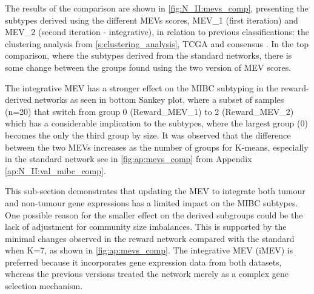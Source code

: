 The results of the comparison are shown in \cref{fig:N_II:mevs_comp}, presenting the subtypes derived using the different MEVs scores, MEV\_1 (first iteration) and MEV\_2 (second iteration - integrative), in relation to previous classifications: the clustering analysis from \cref{s:clustering_analysis}, TCGA and consensus \citep{Robertson2017-mg,Kamoun2020-tj}. In the top comparison, where the subtypes derived from the standard networks, there is some change between the groups found using the two version of MEV scores.

The integrative MEV has a stronger effect on the MIBC subtyping in the reward-derived networks as seen in bottom Sankey plot, where a subset of samples (n=20) that switch from group 0 (Reward\_MEV\_1) to 2 (Reward\_MEV\_2) which has a considerable implication to the subtypes, where the largest group (0) becomes the only the third group by size. It was observed that the difference between the two MEVs increases as the number of groups for K-means, especially in the standard network see in \cref{fig:ap:mevs_comp} from Appendix \cref{ap:N_II:val_mibc_comp}.  

This sub-section demonstrates that updating the MEV to integrate both tumour and non-tumour gene expressions has a limited impact on the MIBC subtypes. One possible reason for the smaller effect on the derived subgroups could be the lack of adjustment for community size imbalances. This is supported by the minimal changes observed in the reward network compared with the standard when K=7, as shown in \cref{fig:ap:mevs_comp}. The integrative MEV (iMEV) is preferred because it incorporates gene expression data from both datasets, whereas the previous versions treated the network merely as a complex gene selection mechanism.



